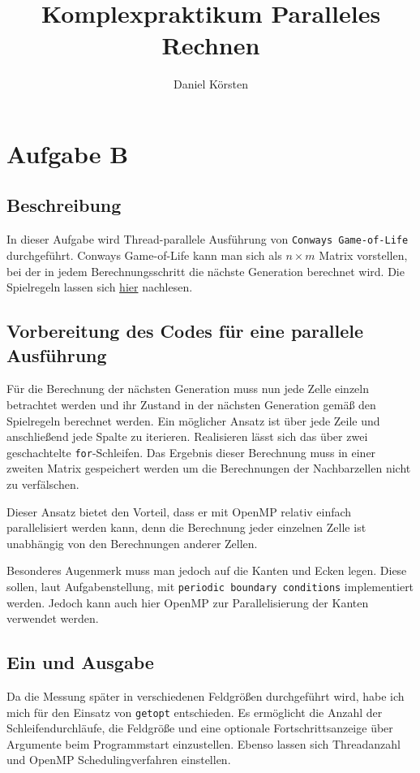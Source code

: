 \documentclass[german,plainarticle,hyperref,utf8]{zihpub}
\author{Daniel Körsten}
\title{Komplexpraktikum Paralleles Rechnen}
\begin{document}
	\section{Aufgabe B}
	\subsection{Beschreibung}
	In dieser Aufgabe wird Thread-parallele Ausführung von \verb|Conways Game-of-Life| durchgeführt. Conways Game-of-Life kann man sich als $n\times m$ Matrix vorstellen, bei der in jedem Berechnungsschritt die nächste Generation berechnet wird. Die Spielregeln lassen sich \href{https://de.wikipedia.org/wiki/Conways_Spiel_des_Lebens#Die_Spielregeln}{hier} nachlesen.
	
	\subsection{Vorbereitung des Codes für eine parallele Ausführung}
	Für die Berechnung der nächsten Generation muss nun jede Zelle einzeln betrachtet werden und ihr Zustand in der nächsten Generation gemäß den Spielregeln berechnet werden.
	Ein möglicher Ansatz ist über jede Zeile und anschließend jede Spalte zu iterieren. Realisieren lässt sich das über zwei geschachtelte \verb|for|-Schleifen. Das Ergebnis dieser Berechnung muss in einer zweiten Matrix gespeichert werden um die Berechnungen der Nachbarzellen nicht zu verfälschen.
	
	Dieser Ansatz bietet den Vorteil, dass er mit OpenMP relativ einfach parallelisiert werden kann, denn die Berechnung jeder einzelnen Zelle ist unabhängig von den Berechnungen anderer Zellen.
	
	Besonderes Augenmerk muss man jedoch auf die Kanten und Ecken legen. Diese sollen, laut Aufgabenstellung, mit \verb|periodic boundary conditions| implementiert werden. Jedoch kann auch hier OpenMP zur Parallelisierung der Kanten verwendet werden.

	\subsection{Ein und Ausgabe}
	Da die Messung später in verschiedenen Feldgrößen durchgeführt wird, habe ich mich für den Einsatz von \verb|getopt| entschieden. Es ermöglicht die Anzahl der Schleifendurchläufe, die Feldgröße und eine optionale Fortschrittsanzeige über Argumente beim Programmstart einzustellen.
	Ebenso lassen sich Threadanzahl und OpenMP Schedulingverfahren einstellen.
	
\end{document}
